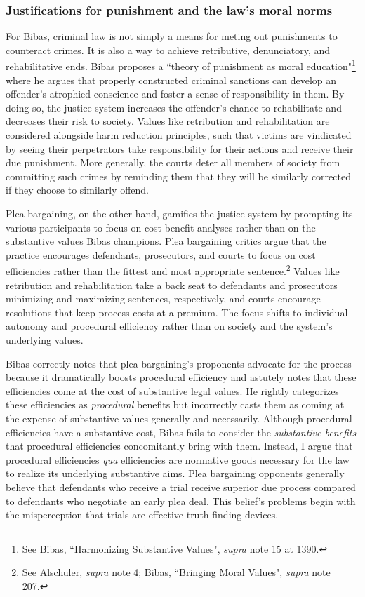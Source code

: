 \subsubsection{Justifications for punishment and the law's moral norms}

For Bibas, criminal law is not simply a means for meting out punishments to counteract crimes. It is also a way to achieve retributive, denunciatory, and rehabilitative ends. Bibas proposes a ``theory of punishment as moral education"\footnote{See Bibas, ``Harmonizing Substantive Values", \textit{supra} note 15 at 1390.} where he argues that properly constructed criminal sanctions can develop an offender's atrophied conscience and foster a sense of responsibility in them. By doing so, the justice system increases the offender's chance to rehabilitate and decreases their risk to society. Values like retribution and rehabilitation are considered alongside harm reduction principles, such that victims are vindicated by seeing their perpetrators take responsibility for their actions and receive their due punishment. More generally, the courts deter all members of society from committing such crimes by reminding them that they will be similarly corrected if they choose to similarly offend. 

Plea bargaining, on the other hand, gamifies the justice system by prompting its various participants to focus on cost-benefit analyses rather than on the substantive values Bibas champions. Plea bargaining critics argue that the practice encourages defendants, prosecutors, and courts to focus on cost efficiencies rather than the fittest and most appropriate sentence.\footnote{See Alschuler, \textit{supra} note 4; Bibas, ``Bringing Moral Values", \textit{supra} note 207.} Values like retribution and rehabilitation take a back seat to defendants and prosecutors minimizing and maximizing sentences, respectively, and courts encourage resolutions that keep process costs at a premium. The focus shifts to individual autonomy and procedural efficiency rather than on society and the system's underlying values.

Bibas correctly notes that plea bargaining's proponents advocate for the process because it dramatically boosts procedural efficiency and astutely notes that these efficiencies come at the cost of substantive legal values. He rightly categorizes these efficiencies as \textit{procedural} benefits but incorrectly casts them as coming at the expense of substantive values generally and necessarily. Although procedural efficiencies have a substantive cost, Bibas fails to consider the \textit{substantive benefits} that procedural efficiencies concomitantly bring with them. Instead, I argue that procedural efficiencies \textit{qua} efficiencies are normative goods necessary for the law to realize its underlying substantive aims. Plea bargaining opponents generally believe that defendants who receive a trial receive superior due process compared to defendants who negotiate an early plea deal. This belief's problems begin with the misperception that trials are effective truth-finding devices.

